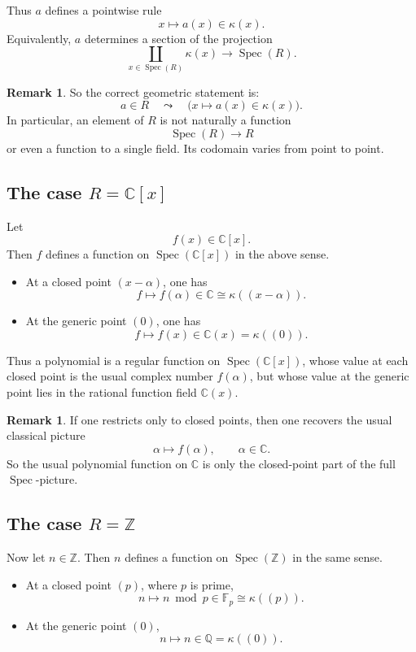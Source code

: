\documentclass[11pt]{article}
\theoremstyle{definition}
\newtheorem{remark}[theorem]{Remark}
\newcommand{\Z}{\mathbb{Z}}
\newcommand{\Q}{\mathbb{Q}}
\newcommand{\C}{\mathbb{C}}
\newcommand{\F}{\mathbb{F}}
\newcommand{\Spec}{\operatorname{Spec}}
\newcommand{\kk}[1]{\kappa\!\left(#1\right)}
\begin{document}
Thus \(a\) defines a pointwise rule
\[
x\longmapsto a(x)\in \kk{x}.
\]
Equivalently, \(a\) determines a section of the projection
\[
\coprod_{x\in \Spec(R)} \kk{x}\longrightarrow \Spec(R).
\]

\begin{remark}
	So the correct geometric statement is:
	\[
	\boxed{
		a\in R
		\quad\leadsto\quad
		\bigl(x\mapsto a(x)\in \kk{x}\bigr).
	}
	\]
	In particular, an element of \(R\) is not naturally a function
	\[
	\Spec(R)\to R
	\]
	or even a function to a single field. Its codomain varies from point to point.
\end{remark}

\subsection{The case \texorpdfstring{$R=\C[x]$}{R=C[x]}}

Let
\[
f(x)\in \C[x].
\]
Then \(f\) defines a function on \(\Spec(\C[x])\) in the above sense.

\begin{itemize}
	\item At a closed point \((x-\alpha)\), one has
	\[
	f \longmapsto f(\alpha)\in \C \cong \kk{(x-\alpha)}.
	\]
	
	\item At the generic point \((0)\), one has
	\[
	f \longmapsto f(x)\in \C(x)=\kk{(0)}.
	\]
\end{itemize}

Thus a polynomial is a regular function on \(\Spec(\C[x])\), whose value at each closed point is the usual complex number \(f(\alpha)\), but whose value at the generic point lies in the rational function field \(\C(x)\).

\begin{remark}
	If one restricts only to closed points, then one recovers the usual classical picture
	\[
	\alpha\longmapsto f(\alpha),\qquad \alpha\in \C.
	\]
	So the usual polynomial function on \(\C\) is only the closed-point part of the full \(\Spec\)-picture.
\end{remark}

\subsection{The case \texorpdfstring{$R=\Z$}{R=Z}}

Now let \(n\in \Z\). Then \(n\) defines a function on \(\Spec(\Z)\) in the same sense.

\begin{itemize}
	\item At a closed point \((p)\), where \(p\) is prime,
	\[
	n \longmapsto n \bmod p \in \F_p \cong \kk{(p)}.
	\]
	
	\item At the generic point \((0)\),
	\[
	n \longmapsto n\in \Q=\kk{(0)}.
	\]
\end{itemize}
\end{document}
